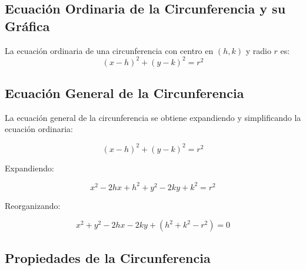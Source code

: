 \subsection{Ecuación Ordinaria de la Circunferencia y su Gráfica}

La ecuación ordinaria de una circunferencia con centro en \((h, k)\) y radio \(r\) es:
\begin{equation}
    (x - h)^2 + (y - k)^2 = r^2
\end{equation}

        
        

\subsection{Ecuación General de la Circunferencia}

La ecuación general de la circunferencia se obtiene expandiendo y simplificando la ecuación ordinaria:

\[
(x - h)^2 + (y - k)^2 = r^2
\]

Expandiendo:

\[
x^2 - 2hx + h^2 + y^2 - 2ky + k^2 = r^2
\]

Reorganizando:

\[
x^2 + y^2 - 2hx - 2ky + (h^2 + k^2 - r^2) = 0
\]

\subsection{Propiedades de la Circunferencia}

